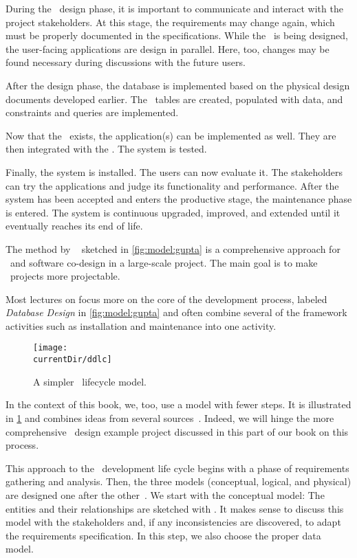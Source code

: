 During the \db\ design phase, it is important to communicate and interact with the project stakeholders.
At this stage, the requirements may change again, which must be properly documented in the specifications.
While the \db\ is being designed, the user-facing applications are design in parallel.
Here, too, changes may be found necessary during discussions with the future users.

After the design phase, the database is implemented based on the physical design documents developed earlier.
The \db\ tables are created, populated with data, and constraints and queries are implemented.

Now that the \db\ exists, the application(s) can be implemented as well.
They are then integrated with the \db.
The system is tested.

Finally, the system is installed.
The users can now evaluate it.
The stakeholders can try the applications and judge its functionality and performance.
After the system has been accepted and enters the productive stage, the maintenance phase is entered.
The system is continuous upgraded, improved, and extended until it eventually reaches its end of life.

The method by \citeauthor{GMTM2011DDLC}~\cite{GMTM2011DDLC} sketched in \cref{fig:model:gupta} is a comprehensive approach for \db\ and software co-design in a large-scale project.
The main goal is to make \db\ projects more projectable.

Most lectures on  focus more on the core of the development process, labeled \emph{Database Design} in \cref{fig:model:gupta} and often combine several of the framework activities such as installation and maintenance into one activity.

\begin{figure}%
\centering%
\texttt{[image: \\currentDir/ddlc]}%
\caption{A simpler \db\ lifecycle model.}%
\label{fig:model:ddlc}%
\end{figure}%

In the context of this book, we, too, use a model with fewer steps.
It is illustrated in \cref{fig:model:ddlc} and combines ideas from several sources~\cite{SS2005EIDDDFDB:I,SS2005EIDDDFDB:CDDRAAML,D2022DN:DRA}.
Indeed, we will hinge the more comprehensive \db\ design example project discussed in this part of our book on this process.

This approach to the \db\ development life cycle begins with a phase of requirements gathering and analysis.
Then, the three models (conceptual, logical, and physical) are designed one after the other~\cite{EN2015FODS}.
We start with the conceptual model:
The entities and their relationships are sketched with .
It makes sense to discuss this model with the stakeholders and, if any inconsistencies are discovered, to adapt the requirements specification.
In this step, we also choose the proper data model.

